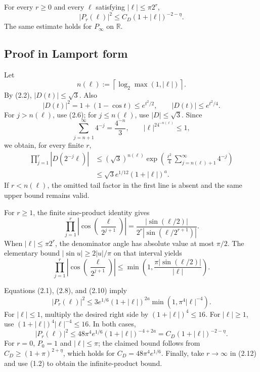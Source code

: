\documentclass[11pt,a4paper]{article}
\begin{document}
\begin{lemma}\label{lem:envelope}
For every \(r\ge0\) and every \(\ell\) satisfying
\(|\ell|\le\pi2^r\),
\[
 |P_r(\ell)|^2\le C_D(1+|\ell|)^{-2-\eta}.                     \tag{2.4}
\]
The same estimate holds for \(P_\infty\) on \(\mathbb R\).
\end{lemma}

\subsection*{Proof in Lamport form}


Let
\[
 n(\ell):=\left\lceil\log_2\max(1,|\ell|)\right\rceil.          \tag{2.5}
\]
By (2.2), \(|D(t)|\le\sqrt3\).  Also
\[
 |D(t)|^2=1+(1-\cos t)\le e^{t^2/2},
\qquad |D(t)|\le e^{t^2/4}.                                   \tag{2.6}
\]
For \(j>n(\ell)\), use (2.6); for \(j\le n(\ell)\), use
\(|D|\le\sqrt3\).  Since
\[
 \sum_{j=n+1}^\infty4^{-j}=\frac{4^{-n}}3,\qquad
 |\ell|^24^{-n(\ell)}\le1,                                    \tag{2.7}
\]
we obtain, for every finite \(r\),
\begin{align}
 \prod_{j=1}^r|D(2^{-j}\ell)|
 &\le(\sqrt3)^{n(\ell)}
 \exp\left(\frac{\ell^2}{4}\sum_{j=n(\ell)+1}^\infty4^{-j}\right)\\
 &\le\sqrt3e^{1/12}(1+|\ell|)^a.                              \tag{2.8}
\end{align}
If \(r<n(\ell)\), the omitted tail factor in the first line is absent and the
same upper bound remains valid.


For \(r\ge1\), the finite sine-product identity gives
\[
 \prod_{j=1}^r\left|\cos\left(\frac{\ell}{2^{j+1}}\right)\right|
 =\frac{|\sin(\ell/2)|}{2^r|\sin(\ell/2^{r+1})|}.              \tag{2.9}
\]
When \(|\ell|\le\pi2^r\), the denominator angle has absolute value at most
\(\pi/2\).  The elementary bound
\(|\sin u|\ge2|u|/\pi\) on that interval yields
\[
 \prod_{j=1}^r\left|\cos\left(\frac{\ell}{2^{j+1}}\right)\right|
 \le\min\left(1,\frac{\pi|\sin(\ell/2)|}{|\ell|}\right).        \tag{2.10}
\]


Equations (2.1), (2.8), and (2.10) imply
\[
 |P_r(\ell)|^2
 \le3e^{1/6}(1+|\ell|)^{2a}
 \min(1,\pi^4|\ell|^{-4}).                                    \tag{2.11}
\]
For \(|\ell|\le1\), multiply the desired right side by
\((1+|\ell|)^4\le16\).  For \(|\ell|\ge1\), use
\((1+|\ell|)^4|\ell|^{-4}\le16\).  In both cases,
\[
 |P_r(\ell)|^2
 \le48\pi^4e^{1/6}(1+|\ell|)^{-4+2a}
 =C_D(1+|\ell|)^{-2-\eta}.                                   \tag{2.12}
\]
For \(r=0\), $P_0=1$ and $|\ell|\le\pi$; the claimed bound follows from
$C_D\ge(1+\pi)^{2+\eta}$, which holds for
$C_D=48\pi^4e^{1/6}$.  Finally, take \(r\to\infty\) in (2.12) and use (1.2) to obtain the
infinite-product bound. \QedStep
\end{document}
